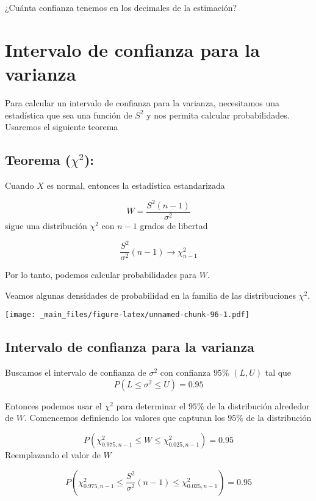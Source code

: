 \documentclass[
]{book}
\begin{document}
¿Cuánta confianza tenemos en los decimales de la estimación?

\hypertarget{intervalo-de-confianza-para-la-varianza}{%
\section{Intervalo de confianza para la varianza}\label{intervalo-de-confianza-para-la-varianza}}

Para calcular un intervalo de confianza para la varianza, necesitamos una estadística que sea una función de \(S^2\) y nos permita calcular probabilidades. Usaremos el siguiente teorema

\hypertarget{teorema-chi2}{%
\subsection{\texorpdfstring{Teorema (\(\chi^2\)):}{Teorema (\textbackslash chi\^{}2):}}\label{teorema-chi2}}

Cuando \(X\) es normal, entonces la estadística estandarizada

\[W=\frac{S^2(n-1)}{\sigma^2}\]
sigue una distribución \(\chi^2\) con \(n-1\) grados de libertad

\[\frac{S^2}{\sigma^2}(n-1)\rightarrow \chi^2_{n-1}\]

Por lo tanto, podemos calcular probabilidades para \(W\).

Veamos algunas densidades de probabilidad en la familia de las distribuciones \(\chi^2\).

\texttt{[image: \_main\_files/figure-latex/unnamed-chunk-96-1.pdf]}

\hypertarget{intervalo-de-confianza-para-la-varianza-1}{%
\subsection{Intervalo de confianza para la varianza}\label{intervalo-de-confianza-para-la-varianza-1}}

Buscamos el intervalo de confianza de \(\sigma^2\) con confianza \(95\%\) \((L,U)\) tal que \[P(L \leq \sigma^2 \leq U)=0.95\]

Entonces podemos usar el \(\chi^2\) para determinar el \(95\%\) de la distribución alrededor de \(W\). Comencemos definiendo los valores que capturan los \(95\%\) de la distribución

\[P(\chi^2_{0.975,n-1} \leq W \leq \chi^2_{0.025,n-1})=0.95\]
Reemplazando el valor de \(W\)

\[P(\chi^2_{0.975,n-1} \leq \frac{S^2}{\sigma^2}(n-1) \leq \chi^2_{0.025,n-1})= 0.95\]
\end{document}
